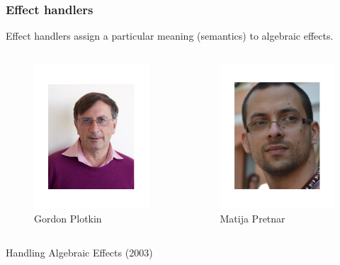 \begin{frame}
  \frametitle{Effect handlers}
  Effect handlers assign a particular meaning (semantics) to algebraic effects.
  \begin{columns}
    \begin{column}{0.5\textwidth}
      \begin{center}
        \begin{figure}
          \includegraphics[scale=0.3]{figures/gordonplotkin.png}
          \caption{Gordon Plotkin}
        \end{figure}
      \end{center}
    \end{column}
    \begin{column}{0.5\textwidth}
      \begin{center}
        \begin{figure}
          \includegraphics[scale=0.3]{figures/pretnar.png}
          \caption{Matija Pretnar}
        \end{figure}
      \end{center}
    \end{column}
  \end{columns}
  \begin{center}
      Handling Algebraic Effects (2003)
  \end{center}
\end{frame}

